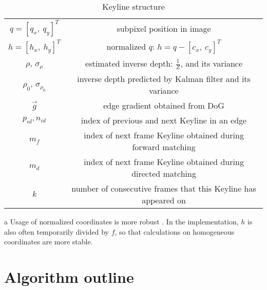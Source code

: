 \begin{table}[ht]
	\centering
	
	\begin{threeparttable}
		\caption{Keyline structure}
		\label{tab:keyline}
		
		\begin{tabularx}{1.0\textwidth}{C{0.25} C{0.75}}
			\toprule
			 &  \\
			\midrule
			$q = [q_{x},\ q_{y}]^T$ & subpixel position in image \\
			$h = [h_{x},\ h_{y}]^T$ & normalized $q$: $h = q - [c_{x},\ c_{y}]^T$ \\
			$\rho$, $\sigma_{\rho}$ & estimated inverse depth: $\frac{1}{Z}$, and its variance \\
			$\rho_0$, $\sigma_{\rho_{0}}$ & inverse depth predicted by Kalman filter and its variance \\
			$\vec{g}$ & edge gradient obtained from DoG \\
			$p_{id}, n_{id}$ & index of previous and next Keyline in an edge \\
			$m_f$ & index of next frame Keyline obtained during forward matching \\
			$m_d$ & index of next frame Keyline obtained during directed matching \\
			$k$ & number of consecutive frames that this Keyline has appeared on \\
			\bottomrule
		\end{tabularx}
		
		\begin{tablenotes}
			\footnotesize
			\item[a] Usage of normalized coordinates is more robust \cite{hartley1997defense}. In the implementation, $h$ is also often temporarily divided by $f$, so that calculations on homogeneous coordinates are more stable.
		\end{tablenotes}
		
	\end{threeparttable}
\end{table}

\newpage

\section{Algorithm outline}
\label{sec:alg}

